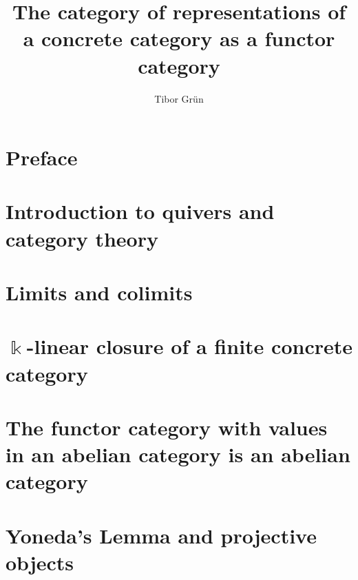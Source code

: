 \documentclass{article}
\title{The category of representations of a concrete category as a functor category}
\author{Tibor Gr{\"u}n}
\begin{document}

	\maketitle

	\newpage

	\tableofcontents\label{toc}
	
	\newpage

	
\section*{Preface}

\newpage
\section{Introduction to quivers and category theory}


\newpage
\section{Limits and colimits}


\newpage
\section{$\Bbbk$-linear closure of a finite concrete category}


%

\newpage
\section{The functor category with values in an abelian category is an abelian category}


\newpage
\section{Yoneda's Lemma and projective objects}

\end{document}
